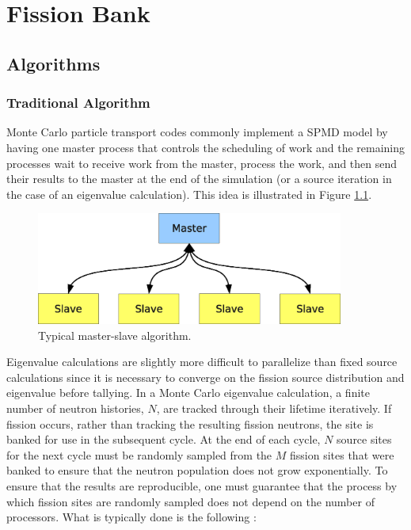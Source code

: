 \chapter{Fission Bank}

\section{Algorithms}
\label{sec:algorithms}

\subsection{Traditional Algorithm}

Monte Carlo particle transport codes commonly implement a SPMD model
by having one master process that controls the scheduling of work and
the remaining processes wait to receive work from the master, process
the work, and then send their results to the master at the end of the
simulation (or a source iteration in the case of an eigenvalue
calculation). This idea is illustrated in Figure
\ref{fig:master-slave}.
\begin{figure}[h!]
  \centering
  \includegraphics[width=0.9\textwidth]{figures/master-slave/master-slave.eps}
  \caption{Typical master-slave algorithm.}
  \label{fig:master-slave}
\end{figure}

Eigenvalue calculations are slightly more difficult to parallelize
than fixed source calculations since it is necessary to converge on
the fission source distribution and eigenvalue before tallying. In a
Monte Carlo eigenvalue calculation, a finite number of neutron
histories, $N$, are tracked through their lifetime iteratively. If
fission occurs, rather than tracking the resulting fission neutrons,
the site is banked for use in the subsequent cycle. At the end of each
cycle, $N$ source sites for the next cycle must be randomly sampled
from the $M$ fission sites that were banked to ensure that the neutron
population does not grow exponentially. To ensure that the results are
reproducible, one must guarantee that the process by which fission
sites are randomly sampled does not depend on the number of
processors. What is typically done is the following \cite{mcnp}:


